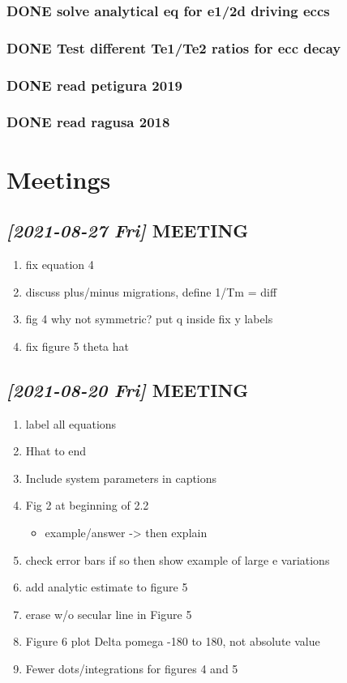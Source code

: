 \documentclass[11pt]{article}
\begin{document}
\subsubsection{{\bfseries\sffamily DONE} solve analytical eq for e1/2d driving eccs}
\label{sec:org55cfc2b}
\subsubsection{{\bfseries\sffamily DONE} Test different Te1/Te2 ratios for ecc decay}
\label{sec:orgcb28c25}
\subsubsection{{\bfseries\sffamily DONE} read petigura 2019}
\label{sec:org7a59980}
\subsubsection{{\bfseries\sffamily DONE} read ragusa 2018}
\label{sec:orgc191839}
\section{Meetings}
\label{sec:org1497a99}
\subsection{\textit{[2021-08-27 Fri] } MEETING}
\label{sec:org1285e40}
\begin{enumerate}
\item fix equation 4
\item discuss plus/minus migrations, define 1/Tm = diff
\item fig 4 why not symmetric? put q inside fix y labels
\item fix figure 5 theta hat
\end{enumerate}
\subsection{\textit{[2021-08-20 Fri] } MEETING}
\label{sec:orgc888c31}
\begin{enumerate}
\item label all equations
\item Hhat to end
\item Include system parameters in captions
\item Fig 2 at beginning of 2.2
\begin{itemize}
\item example/answer -> then explain
\end{itemize}
\item check error bars if so then show example of large e variations
\item add analytic estimate to figure 5
\item erase w/o secular line in Figure 5
\item Figure 6 plot Delta pomega -180 to 180, not absolute value
\item Fewer dots/integrations for figures 4 and 5
\end{enumerate}
\end{document}
